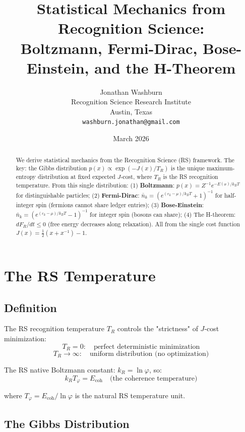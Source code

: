 \documentclass[12pt,a4paper]{article}
\title{Statistical Mechanics from Recognition Science:\\
Boltzmann, Fermi-Dirac, Bose-Einstein, and the H-Theorem}
\author{Jonathan Washburn\\
Recognition Science Research Institute\\
Austin, Texas\\
\texttt{washburn.jonathan@gmail.com}}
\date{March 2026}
\theoremstyle{definition}
\theoremstyle{remark}
\begin{document}
\maketitle

\begin{abstract}
We derive statistical mechanics from the Recognition Science (RS) framework.
The key: the Gibbs distribution $p(x) \propto \exp(-J(x)/T_R)$ is the unique 
maximum-entropy distribution at fixed expected $J$-cost, where $T_R$ is the 
RS recognition temperature. From this single distribution:
(1) \textbf{Boltzmann}: $p(x) = Z^{-1} e^{-E(x)/k_B T}$ for distinguishable particles;
(2) \textbf{Fermi-Dirac}: $\bar{n}_k = (e^{(\varepsilon_k - \mu)/k_B T} + 1)^{-1}$ 
for half-integer spin (fermions cannot share ledger entries);
(3) \textbf{Bose-Einstein}: $\bar{n}_k = (e^{(\varepsilon_k - \mu)/k_B T} - 1)^{-1}$ 
for integer spin (bosons can share);
(4) The H-theorem: $dF_R/dt \leq 0$ (free energy decreases along relaxation).
All from the single cost function $J(x) = \frac{1}{2}(x + x^{-1}) - 1$.
\end{abstract}

\section{The RS Temperature}

\subsection{Definition}

The RS recognition temperature $T_R$ controls the "strictness" of $J$-cost minimization:
\begin{equation}
T_R = 0: \quad \text{perfect deterministic minimization}
\end{equation}
\begin{equation}
T_R \to \infty: \quad \text{uniform distribution (no optimization)}
\end{equation}

The RS native Boltzmann constant: $k_R = \ln\varphi$, so:
\begin{equation}
k_R T_\varphi = E_\mathrm{coh} \quad \text{(the coherence temperature)}
\end{equation}

where $T_\varphi = E_\mathrm{coh}/\ln\varphi$ is the natural RS temperature unit.

\subsection{The Gibbs Distribution}
\end{document}
